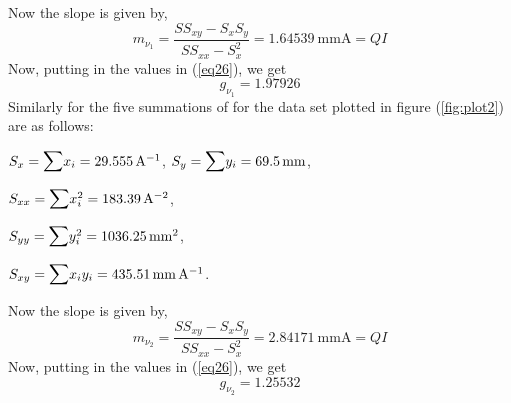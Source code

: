 \documentclass[%
 reprint,
nofootinbib,
 amsmath,amssymb,
 aps,
floatfix,
]{revtex4-2}
\begin{document}
    \par
    \vspace{0.5cm}
    Now the slope is given by,
    \begin{equation}
        m_{\nu_1} = \dfrac{S S_{xy} - S_{x}S_{y}}{S S_{xx} - S_{x}^2} = \SI{1.64539}{\milli \metre \ampere} = QI
    \end{equation}
    Now, putting in the values in (\ref{eq26}), we get 
        \begin{equation}
            \boxed{g_{\nu_1} = 1.97926} 
        \end{equation}
    Similarly for the five summations of for the data set plotted in figure (\ref{fig:plot2}) are as follows:
    \par
    \vspace{0.5cm}
    $S_{x} = \mathlarger{\mathlarger{\sum}} x_{i} = \SI{29.555}{\per \ampere}$, \hspace{0.5cm} $S_{y} = \mathlarger{\mathlarger{\sum}} y_{i} = \SI{69.5}{\milli \metre}$,
    \par
    \vspace{0.5cm}
    $S_{xx} = \mathlarger{\mathlarger{\sum}} x_{i}^2 = \SI{183.39}{\per \ampere \squared}$,
    \par
    \vspace{0.5cm}
    $S_{yy} = \mathlarger{\mathlarger{\sum}} y_{i}^2 = \SI{1036.25}{\milli \metre \squared}$,
    \par
    \vspace{0.5cm}
    $S_{xy} = \mathlarger{\mathlarger{\sum}} x_{i}y_{i} = \SI{435.51}{\milli \metre \per \ampere}$.
    \par
    \vspace{0.5cm}
    Now the slope is given by,
    \begin{equation}
        m_{\nu_2} = \dfrac{S S_{xy} - S_{x}S_{y}}{S S_{xx} - S_{x}^2} = \SI{2.84171}{\milli \metre \ampere} = QI
    \end{equation}
    Now, putting in the values in (\ref{eq26}), we get 
        \begin{equation}
            \boxed{g_{\nu_2} = 1.25532}
        \end{equation}
    



    
\end{document}
